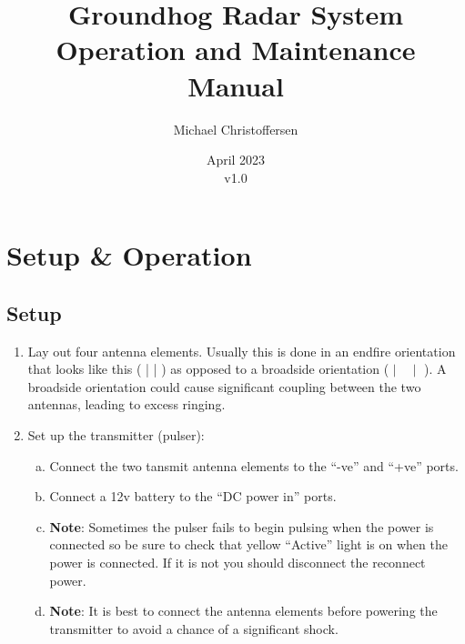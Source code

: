 \documentclass[titlepage]{article}
\title{\Huge Groundhog Radar System Operation and Maintenance Manual}
\author{\LARGE Michael Christoffersen}
\date{\LARGE April 2023\\v1.0}
\begin{document}
\maketitle

\tableofcontents

\pagebreak

\section{Setup \& Operation}
\subsection{Setup}
\begin{enumerate}[1.]
    \item Lay out four antenna elements. Usually this is done in an endfire orientation that looks like this ( | | ) as opposed to a broadside orientation ( $\mid \hspace{1em} \mid$ ). A broadside orientation could cause significant coupling between the two antennas, leading to excess ringing.
    \item Set up the transmitter (pulser):
    \begin{enumerate}[(a)]
        \item Connect the two tansmit antenna elements to the ``-ve'' and ``+ve'' ports.
        \item Connect a 12v battery to the ``DC power in'' ports.
        \item \textbf{Note}: Sometimes the pulser fails to begin pulsing when the power is connected so be sure to check that yellow ``Active'' light is on when the power is connected. If it is not you should disconnect the reconnect power.
        \item \textbf{Note}: It is best to connect the antenna elements before powering the transmitter to avoid a chance of a significant shock.
    \end{enumerate}
    

\end{enumerate}
\end{document}
